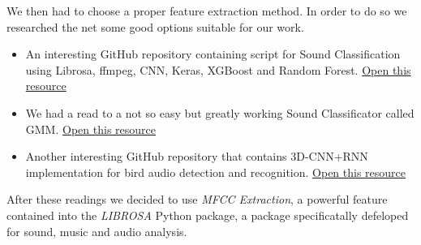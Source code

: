 \documentclass{article}
\begin{document}
We then had to choose a proper feature extraction method. In order to do so we researched the net some good options suitable for our work.
\begin{itemize}
  \item An interesting GitHub repository containing script for Sound Classification using Librosa, ffmpeg, CNN, Keras, XGBoost and Random Forest. \hyperlink{https://github.com/ravising-h/Urbansound8k}{Open this resource}
  \item We had a read to a not so easy but greatly working Sound Classificator called GMM. \hyperlink{https://towardsdatascience.com/gaussian-mixture-modelling-gmm-833c88587c7f}{Open this resource}
  \item Another interesting GitHub repository that contains 3D-CNN+RNN implementation for bird audio detection and recognition. \hyperlink{https://github.com/himaivan/BAD2}{Open this resource}
\end{itemize}

After these readings we decided to use \emph{MFCC Extraction}, a powerful feature contained into the \emph{LIBROSA} Python package, a package specificatally defeloped for sound, music and audio analysis.
\end{document}
